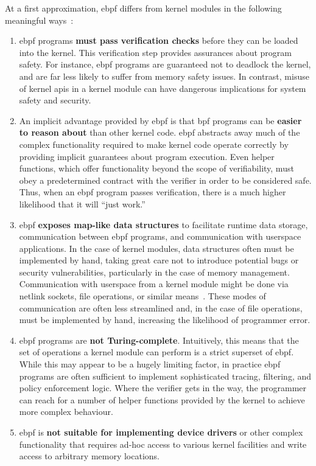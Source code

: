 At a first approximation, \gls{ebpf} differs from kernel modules in the following meaningful ways~\cite{gregg2019_bpf}:
\begin{enumerate}
  \item \gls{ebpf} programs \textbf{must pass verification checks} before they can be loaded into the
  kernel. This verification step provides assurances about program safety. For instance, \gls{ebpf}
  programs are guaranteed not to deadlock the kernel, and are far less likely to suffer from
  memory safety issues. In contrast, misuse of kernel \gls{api}s in a kernel module can have dangerous
  implications for system safety and security.

  \item An implicit advantage provided by \gls{ebpf} is that \gls{bpf} programs can be \textbf{easier
  to reason about} than other kernel code. \gls{ebpf} abstracts away much of the complex
  functionality required to make kernel code operate correctly by providing implicit
  guarantees about program execution. Even helper functions, which offer functionality
  beyond the scope of verifiability, must obey a predetermined contract with the verifier
  in order to be considered safe. Thus, when an \gls{ebpf} program passes verification, there is
  a much higher likelihood that it will \enquote{just work.}

  \item \gls{ebpf} \textbf{exposes map-like data structures} to facilitate runtime data storage,
  communication between \gls{ebpf} programs, and communication with userspace applications. In
  the case of kernel modules, data structures often must be implemented by hand, taking
  great care not to introduce potential bugs or security vulnerabilities, particularly in
  the case of memory management. Communication with userspace from a kernel module might
  be done via netlink sockets, file operations, or similar
  means~\cite{corbet1998_device_drivers}. These modes of communication are often less
  streamlined and, in the case of file operations, must be implemented by hand, increasing
  the likelihood of programmer error.

  \item \gls{ebpf} programs are \textbf{not Turing-complete}. Intuitively, this means that
  the set of operations a kernel module can perform is a strict superset of \gls{ebpf}. While
  this may appear to be a hugely limiting factor, in practice \gls{ebpf} programs are often
  sufficient to implement sophisticated tracing, filtering, and policy enforcement logic.
  Where the verifier gets in the way, the programmer can reach for a number of helper
  functions provided by the kernel to achieve more complex behaviour.

  \item \gls{ebpf} is \textbf{not suitable for implementing device drivers} or other complex
  functionality that requires ad-hoc access to various kernel facilities and write access
  to arbitrary memory locations.
\end{enumerate}

